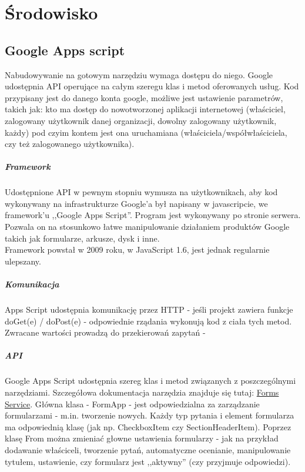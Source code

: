 \chapter{Środowisko}
\section{Google Apps script}
Nabudowywanie na gotowym narzędziu wymaga dostępu do niego. Google udostępnia API operujące na całym szeregu klas i metod oferowanych usług. Kod przypisany jest do danego konta google, możliwe jest ustawienie parametrów,  takich  jak: kto ma dostęp do nowotworzonej aplikacji internetowej (właściciel, zalogowany użytkownik danej organizacji, dowolny zalogowany użytkownik, każdy) pod czyim kontem jest ona uruchamiana (właściciela/współwłaściciela, czy też zalogowanego użytkownika). 

\paragraph{Framework}
Udostępnione API w pewnym stopniu wymusza na użytkownikach, aby kod wykonywany na infrastrukturze Google'a był napisany w javascripcie, we framework'u ,,Google Apps Script''. Program jest wykonywany po stronie serwera. Pozwala on na stosunkowo łatwe manipulowanie działaniem produktów Google takich jak formularze, arkusze, dysk i inne. \\
Framework powstał w 2009 roku, w JavaScript 1.6, jest jednak regularnie ulepszany.

\paragraph{Komunikacja}
 Apps Script udostępnia komunikację przez HTTP - jeśli projekt zawiera funkcje doGet(e){} / doPost(e){} - odpowiednie rządania wykonują kod z ciała tych metod. Zwracane wartości prowadzą do przekierowań zapytań  - %
\paragraph{API}
Google Apps Script udostępnia szereg klas i metod związanych z poszczególnymi narzędziami. Szczegółowa dokumentacja narzędzia znajduje się tutaj: \href{https://developers.google.com/apps-script/reference/forms}{Forms Service}.
 Główna klasa - FormApp - jest odpowiedzialna za zarządzanie formularzami - m.in. tworzenie nowych. Każdy typ pytania i element formularza ma odpowiednią klasę (jak np. CheckboxItem czy SectionHeaderItem). Poprzez klasę From  można zmieniać głowne ustawienia formularzy  - jak na przykład dodawanie właściceli, tworzenie pytań, automatyczne ocenianie, manipulowanie tytułem, ustawienie, czy formularz jest ,,aktywny'' (czy przyjmuje odpowiedzi).
